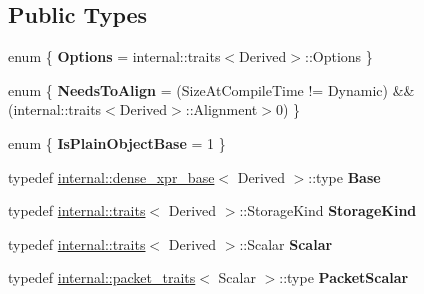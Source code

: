 \subsection*{Public Types}
\begin{DoxyCompactItemize}
\item 
\mbox{\label{class_eigen_1_1_plain_object_base_a63835b387c9b097a195e2d8bf79770be}} 
enum \{ {\bfseries Options} = internal\+::traits$<$Derived$>$\+::Options
 \}
\item 
\mbox{\label{class_eigen_1_1_plain_object_base_ace09aaeb61307a09efdd9064663f1a18}} 
enum \{ {\bfseries Needs\+To\+Align} = (Size\+At\+Compile\+Time != Dynamic) \&\& (internal\+::traits$<$Derived$>$\+::Alignment$>$0)
 \}
\item 
\mbox{\label{class_eigen_1_1_plain_object_base_a005d035e997fb10e451e5edc4ca360ae}} 
enum \{ {\bfseries Is\+Plain\+Object\+Base} = 1
 \}
\item 
\mbox{\label{class_eigen_1_1_plain_object_base_af7336f57da064247e217e46b7a986f55}} 
typedef \mbox{\hyperlink{struct_eigen_1_1internal_1_1dense__xpr__base}{internal\+::dense\+\_\+xpr\+\_\+base}}$<$ Derived $>$\+::type {\bfseries Base}
\item 
\mbox{\label{class_eigen_1_1_plain_object_base_af12ddbff60960617ba01a84d361ba663}} 
typedef \mbox{\hyperlink{struct_eigen_1_1internal_1_1traits}{internal\+::traits}}$<$ Derived $>$\+::Storage\+Kind {\bfseries Storage\+Kind}
\item 
\mbox{\label{class_eigen_1_1_plain_object_base_a7f978b0b6cad676c9d01c2840f8113f5}} 
typedef \mbox{\hyperlink{struct_eigen_1_1internal_1_1traits}{internal\+::traits}}$<$ Derived $>$\+::Scalar {\bfseries Scalar}
\item 
\mbox{\label{class_eigen_1_1_plain_object_base_a2ebcc910069dac4c4562e28db3893250}} 
typedef \mbox{\hyperlink{struct_eigen_1_1internal_1_1packet__traits}{internal\+::packet\+\_\+traits}}$<$ Scalar $>$\+::type {\bfseries Packet\+Scalar}
\item 

\end{DoxyCompactItemize}
